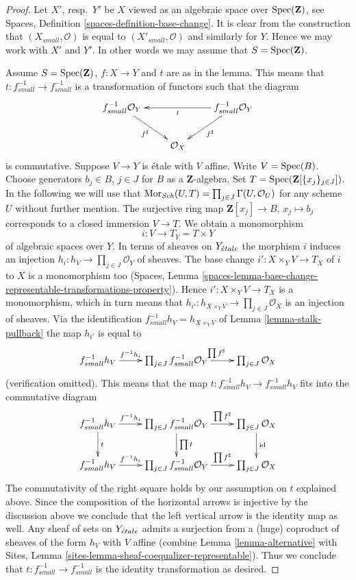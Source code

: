 \begin{proof}
Let $X'$, resp.\ $Y'$ be $X$ viewed as an algebraic space over
$\mathop{\mathrm{Spec}}(\mathbf{Z})$, see
Spaces, Definition \ref{spaces-definition-base-change}.
It is clear from the construction that $(X_{small}, \mathcal{O})$
is equal to $(X'_{small}, \mathcal{O})$ and similarly for $Y$.
Hence we may work with $X'$ and $Y'$. In other words we may
assume that $S = \mathop{\mathrm{Spec}}(\mathbf{Z})$.

\medskip\noindent
Assume $S = \mathop{\mathrm{Spec}}(\mathbf{Z})$, $f : X \to Y$ and $t$ are as in
the lemma. This means that $t : f^{-1}_{small} \to f^{-1}_{small}$
is a transformation of functors such that the diagram
$$
\xymatrix{
f_{small}^{-1}\mathcal{O}_Y
\ar[rd]_{f^\sharp}  & &
f_{small}^{-1}\mathcal{O}_Y \ar[ll]^t \ar[ld]^{f^\sharp} \\
& \mathcal{O}_X
}
$$
is commutative. Suppose $V \to Y$ is \'etale with $V$ affine.
Write $V = \mathop{\mathrm{Spec}}(B)$. Choose generators $b_j \in B$, $j \in J$
for $B$ as a $\mathbf{Z}$-algebra. Set
$T = \mathop{\mathrm{Spec}}(\mathbf{Z}[\{x_j\}_{j \in J}])$.
In the following we will use that
$\mathop{\mathrm{Mor}}\nolimits_{\mathit{Sch}}(U, T) = \prod_{j \in J} \Gamma(U, \mathcal{O}_U)$
for any scheme $U$ without further mention.
The surjective ring map $\mathbf{Z}[x_j] \to B$, $x_j \mapsto b_j$
corresponds to a closed immersion $V \to T$.
We obtain a monomorphism
$$
i : V \longrightarrow T_Y = T \times Y
$$
of algebraic spaces over $Y$. In terms of sheaves on $Y_{\acute{e}tale}$
the morphism $i$ induces an injection
$h_i : h_V \to \prod_{j \in J} \mathcal{O}_Y$ of sheaves.
The base change $i' : X \times_Y V \to T_X$ of $i$ to $X$
is a monomorphism too
(Spaces,
Lemma \ref{spaces-lemma-base-change-representable-transformations-property}).
Hence $i' : X \times_Y V \to T_X$ is a monomorphism, which
in turn means that
$h_{i'} : h_{X \times_Y V} \to \prod_{j \in J} \mathcal{O}_X$
is an injection of sheaves.
Via the identification $f_{small}^{-1}h_V = h_{X \times_Y V}$ of
Lemma \ref{lemma-stalk-pullback}
the map $h_{i'}$ is equal to
$$
\xymatrix{
f_{small}^{-1}h_V \ar[r]^-{f^{-1}h_i} &
\prod_{j \in J} f_{small}^{-1}\mathcal{O}_Y
\ar[r]^{\prod f^\sharp} &
\prod_{j \in J} \mathcal{O}_X
}
$$
(verification omitted). This means that the map
$t : f_{small}^{-1}h_V \to f_{small}^{-1}h_V$
fits into the commutative diagram
$$
\xymatrix{
f_{small}^{-1}h_V \ar[r]^-{f^{-1}h_i} \ar[d]^t &
\prod_{j \in J} f_{small}^{-1}\mathcal{O}_Y
\ar[r]^-{\prod f^\sharp} \ar[d]^{\prod t} &
\prod_{j \in J} \mathcal{O}_X \ar[d]^{\text{id}}\\
f_{small}^{-1}h_V \ar[r]^-{f^{-1}h_i} &
\prod_{j \in J} f_{small}^{-1}\mathcal{O}_Y
\ar[r]^-{\prod f^\sharp} &
\prod_{j \in J} \mathcal{O}_X
}
$$
The commutativity of the right square holds by our assumption on $t$
explained above.
Since the composition of the horizontal arrows is injective
by the discussion above we conclude that the left vertical arrow
is the identity map as well. Any sheaf of sets on
$Y_{\acute{e}tale}$ admits a surjection from a (huge) coproduct of sheaves
of the form $h_V$ with $V$ affine (combine
Lemma \ref{lemma-alternative}
with
Sites, Lemma \ref{sites-lemma-sheaf-coequalizer-representable}).
Thus we conclude that $t : f_{small}^{-1} \to f_{small}^{-1}$
is the identity transformation as desired.
\end{proof}

